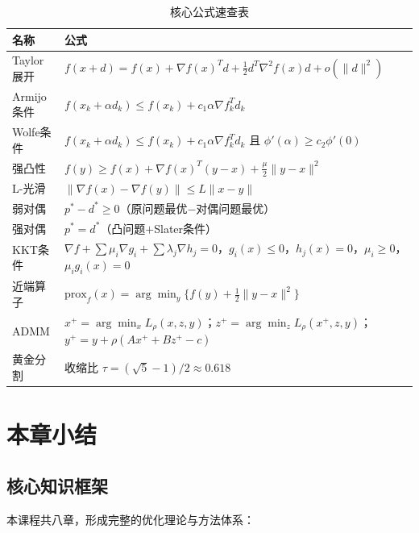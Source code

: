 \begin{table}[H]
\centering
\small
\caption{核心公式速查表}\label{tab:cheatsheet}
\begin{tabular}{@{}>{\raggedright\arraybackslash}p{3cm}>{\raggedright\arraybackslash}p{9.5cm}@{}}
\toprule
\textbf{名称} & \textbf{公式} \\
\midrule
Taylor展开 & $f(x+d) = f(x) + \nabla f(x)^T d + \frac{1}{2} d^T \nabla^2 f(x) d + o(\|d\|^2)$ \\
Armijo条件 & $f(x_k + \alpha d_k) \leq f(x_k) + c_1 \alpha \nabla f_k^T d_k$ \\
Wolfe条件 & $f(x_k + \alpha d_k) \leq f(x_k) + c_1 \alpha \nabla f_k^T d_k$ 且 $\phi'(\alpha) \geq c_2 \phi'(0)$ \\
强凸性 & $f(y) \geq f(x) + \nabla f(x)^T(y-x) + \frac{\mu}{2}\|y-x\|^2$ \\
L-光滑 & $\|\nabla f(x) - \nabla f(y)\| \leq L \|x-y\|$ \\
弱对偶 & $p^* - d^* \geq 0$（原问题最优$-$对偶问题最优） \\
强对偶 & $p^* = d^*$（凸问题$+$Slater条件） \\
KKT条件 & $\nabla f + \sum \mu_i \nabla g_i + \sum \lambda_j \nabla h_j = 0$，$g_i(x) \leq 0$，$h_j(x)=0$，$\mu_i \geq 0$，$\mu_i g_i(x) = 0$ \\
近端算子 & $\text{prox}_f(x) = \arg\min_y \{f(y) + \frac{1}{2}\|y-x\|^2\}$ \\
ADMM & $x^+ = \arg\min_x L_\rho(x,z,y)$；$z^+ = \arg\min_z L_\rho(x^+,z,y)$；$y^+ = y + \rho(Ax^+ + Bz^+ - c)$ \\
黄金分割 & 收缩比 $\tau = (\sqrt{5}-1)/2 \approx 0.618$ \\
\bottomrule
\end{tabular}
\end{table}

\section{本章小结}\label{sec:ch9-summary}

\subsection{核心知识框架}

本课程共八章，形成完整的优化理论与方法体系：

